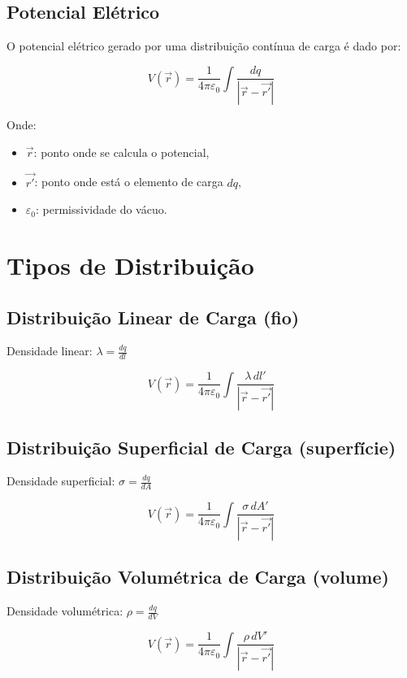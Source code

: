 \documentclass[a4paper,12pt]{article}
\begin{document}
\subsection{Potencial Elétrico}
O potencial elétrico gerado por uma distribuição contínua de carga é dado por:

\begin{equation*}
V(\vec{r}) = \frac{1}{4\pi \varepsilon_0} \int \frac{dq}{|\vec{r} - \vec{r'}|}
\end{equation*}

Onde:
\begin{itemize}
  \item \( \vec{r} \): ponto onde se calcula o potencial,
  \item \( \vec{r'} \): ponto onde está o elemento de carga \( dq \),
  \item \( \varepsilon_0 \): permissividade do vácuo.
\end{itemize}

\section{Tipos de Distribuição}

\subsection{Distribuição Linear de Carga (fio)}

Densidade linear: \( \lambda = \frac{dq}{dl} \)

\[
V(\vec{r}) = \frac{1}{4\pi \varepsilon_0} \int \frac{\lambda \, dl'}{|\vec{r} - \vec{r'}|}
\]

\subsection{Distribuição Superficial de Carga (superfície)}

Densidade superficial: \( \sigma = \frac{dq}{dA} \)

\[
V(\vec{r}) = \frac{1}{4\pi \varepsilon_0} \int \frac{\sigma \, dA'}{|\vec{r} - \vec{r'}|}
\]

\subsection{Distribuição Volumétrica de Carga (volume)}

Densidade volumétrica: \( \rho = \frac{dq}{dV} \)

\[
V(\vec{r}) = \frac{1}{4\pi \varepsilon_0} \int \frac{\rho \, dV'}{|\vec{r} - \vec{r'}|}
\]
\end{document}
